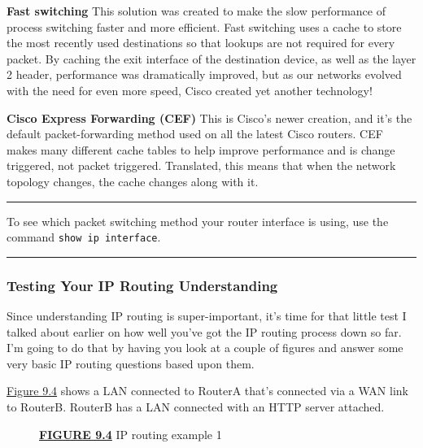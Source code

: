 \textbf{Fast switching} This solution was created to make the slow
performance of process switching faster and more efficient. Fast
switching uses a cache to store the most recently used destinations so
that lookups are not required for every packet. By caching the exit
interface of the destination device, as well as the layer 2 header,
performance was dramatically improved, but as our networks evolved with
the need for even more speed, Cisco created yet another technology!

\textbf{Cisco Express Forwarding (CEF)} This is Cisco's newer creation,
and it's the default packet-forwarding method used on all the latest
Cisco routers. CEF makes many different cache tables to help improve
performance and is change triggered, not packet triggered. Translated,
this means that when the network topology changes, the cache changes
along with it.

\begin{center}\rule{0.5\linewidth}{0.5pt}\end{center}

To see which packet switching method
your router interface is using, use the command
\texttt{show\ ip\ interface}.

\begin{center}\rule{0.5\linewidth}{0.5pt}\end{center}

\subsubsection[Testing Your IP Routing
Understanding]{\texorpdfstring{\protect\hypertarget{c09.xhtmlux5cux23c09-sec-4}{}{}Testing
Your IP Routing Understanding}{Testing Your IP Routing Understanding}}

Since understanding IP routing is super-important, it's time for that
little test I talked about earlier on how well you've got the IP routing
process down so far. I'm going to do that by having you look at a couple
of figures and answer some very basic IP routing questions based upon
them.

\protect\hyperlink{c09.xhtmlux5cux23figure9-4}{Figure 9.4} shows a LAN
connected to RouterA that's connected via a WAN link to RouterB. RouterB
has a LAN connected with an HTTP server attached.

\protect\hypertarget{c09.xhtmlux5cux23Page_368}{}{}

\begin{figure}
\centering
\caption{{\protect\hyperlink{c09.xhtmlux5cux23figureanchor9-4}{\textbf{FIGURE
9.4}} IP routing example 1}}
\end{figure}

